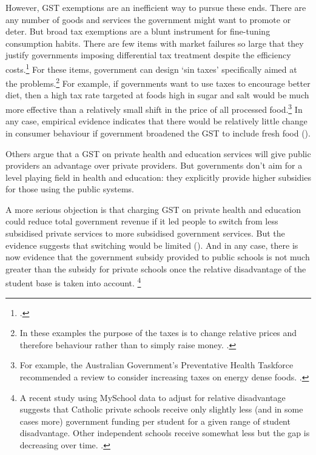 However, GST exemptions are an inefficient way to pursue these ends. There are any number of goods and services the government might want to promote or deter. But broad tax exemptions are a blunt instrument for fine-tuning consumption habits. There are few items with market failures so large that they justify governments imposing differential tax treatment despite the efficiency costs.\footcite[][163]{MirrleesAdamBesleyEtAl2011}  For these items, government can design ‘sin taxes’ specifically aimed at the problems.\footnote{In these examples the purpose of the taxes is to change relative prices and therefore behaviour rather than to simply raise money. \textcites{MirrleesAdamBesleyEtAl2011}{HenryTaxReview2010}.}  For example, if governments want to use taxes to encourage better diet, then a high tax rate targeted at foods high in sugar and salt would be much more effective than a relatively small shift in the price of all processed food.\footnote{For example, the Australian Government’s Preventative Health Taskforce recommended a review to consider increasing taxes on energy dense foods. \textcite[][15]{Preventative-Taskforce2008-Australia-Healthiest-Country-by-2020}.}  In any case, empirical evidence indicates that there would be relatively little change in consumer behaviour if government broadened the GST to include fresh food ().

Others argue that a GST on private health and education services will give public providers an advantage over private providers. But governments don’t aim for a level playing field in health and education: they explicitly provide higher subsidies for those using the public systems. 

A more serious objection is that charging GST on private health and education could reduce total government revenue if it led people to switch from less subsidised private services to more subsidised government services. But the evidence suggests that switching would be limited (). And in any case, there is now evidence that the government subsidy provided to public schools is not much greater than the subsidy for private schools once the relative disadvantage of the student base is taken into account.%
\footnote{A recent study using MySchool data to adjust for relative disadvantage suggests that Catholic private schools receive only slightly less (and in some cases more) government funding per student for a given range of student disadvantage. Other independent schools receive somewhat less but the gap is decreasing over time. \textcite{BonnerSheperd2015}.}


